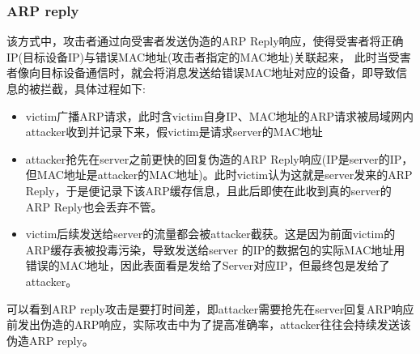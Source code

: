 \subsubsection{ARP reply}
该方式中，攻击者通过向受害者发送伪造的ARP Reply响应，使得受害者将正确IP(目标设备IP)与错误MAC地址(攻击者指定的MAC地址)关联起来，
此时当受害者像向目标设备通信时，就会将消息发送给错误MAC地址对应的设备，即导致信息的被拦截，具体过程如下:
\begin{itemize}
    \item victim广播ARP请求，此时含victim自身IP、MAC地址的ARP请求被局域网内attacker收到并记录下来，假victim是请求server的MAC地址
    \item attacker抢先在server之前更快的回复伪造的ARP Reply响应(IP是server的IP，但MAC地址是attacker的MAC地址)。此时victim认为这就是server发来的ARP Reply，于是便记录下该ARP缓存信息，且此后即使在此收到真的server的ARP Reply也会丢弃不管。
    \item victim后续发送给server的流量都会被attacker截获。这是因为前面victim的ARP缓存表被投毒污染，导致发送给server 的IP的数据包的实际MAC地址用错误的MAC地址，因此表面看是发给了Server对应IP，但最终包是发给了attacker。
\end{itemize}
可以看到ARP reply攻击是要打时间差，即attacker需要抢先在server回复ARP响应前发出伪造的ARP响应，实际攻击中为了提高准确率，attacker往往会持续发送该伪造ARP reply。